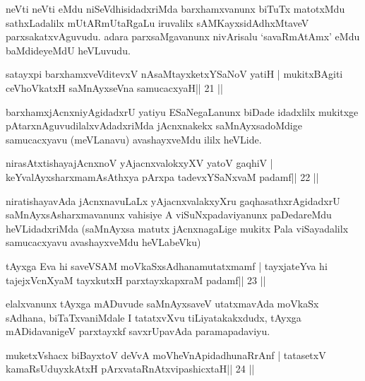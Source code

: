 \begin{artha}
neVti neVti eMdu niSeVdhisidadxriMda barxhamxvanunx biTuTx matotxMdu sathxLadalilx mUtARmUtaRgaLu iruvalilx sAMKayxsidAdhxMtaveV parxsakatxvAguvudu. adara parxsaMgavanunx nivArisalu `savaRmAtAmx' eMdu baMdideyeMdU heVLuvudu.
\end{artha}


\begin{shl}
satayxpi barxhamxveVditevxV nAsaMtayxketxYSaNoV yatiH |
mukitxBAgiti ceVhoVkatxH saMnAyxseVna samucacxyaH\hfill || 21 ||
\end{shl}

\begin{artha}
barxhamxjAcnxniyAgidadxrU yatiyu ESaNegaLanunx biDade idadxlilx mukitxge pAtarxnAguvudilalxvAdadxriMda jAcnxnakekx saMnAyxsadoMdige samucacxyavu (meVLanavu) avashayxveMdu ililx heVLide.
\end{artha}

\begin{shl}
nirasAtxtishayajAcnxnoV yAjacnxvalokxyXV yatoV gaqhiV |
keYvalAyxsharxmamAsAthxya pArxpa tadevxYSaNxvaM padamf\hfill || 22 ||
\end{shl}

\begin{artha}
niratishayavAda jAcnxnavuLaLx yAjacnxvalakxyXru gaqhasathxrAgidadxrU
saMnAyxsAsharxmavanunx vahisiye A viSuNxpadaviyanunx paDedareMdu
heVLidadxriMda (saMnAyxsa matutx jAcnxnagaLige mukitx Pala
viSayadalilx samucacxyavu avashayxveMdu heVLabeVku)
\end{artha}


\begin{shl}
tAyxga Eva hi saveVSAM moVkaSxsAdhanamutatxmamf |
tayxjateYva hi tajejxVcnXyaM tayxkutxH parxtayxkapxraM padamf\hfill || 23 ||
\end{shl}

\begin{artha}
elalxvanunx tAyxga mADuvude saMnAyxsaveV utatxmavAda moVkaSx sAdhana, biTaTxvaniMdale I tatatxvXvu tiLiyatakakxdudx, tAyxga mADidavanigeV parxtayxkf savxrUpavAda paramapadaviyu.
\end{artha}


\begin{shl}
muketxVshacx biBayxtoV deVvA moVheVnApidadhunaRrAnf |
tatasetxV kamaRsUduyxkAtxH pArxvataRnAtxvipashicxtaH\hfill || 24 ||
\end{shl}

